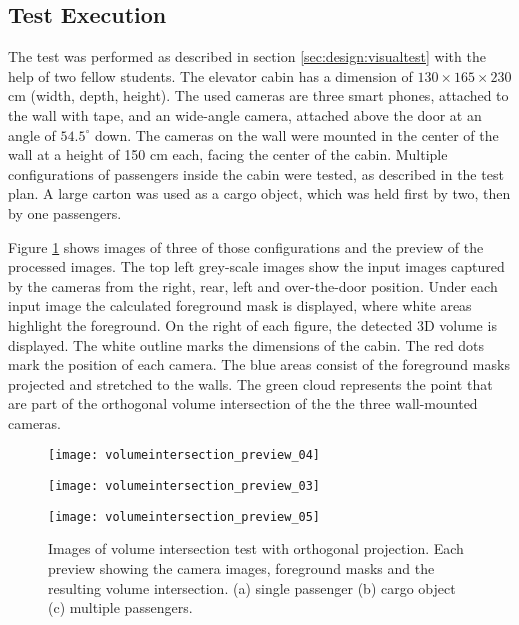 \subsection{Test Execution}
The test was performed as described in section \ref{sec:design:visualtest} with the help of two fellow students.
The elevator cabin has a dimension of $ 130 \times 165 \times 230 $ cm (width, depth, height).
The used cameras are three smart phones, attached to the wall with tape, and an wide-angle camera, attached above the door at an angle of $ 54.5^{\circ} $ down.
The cameras on the wall were mounted in the center of the wall at a height of 150 cm each, facing the center of the cabin.
Multiple configurations of passengers inside the cabin were tested, as described in the test plan.
A large carton was used as a cargo object, which was held first by two, then by one passengers.

Figure \ref{fig:impl:videopreview} shows images of three of those configurations and the preview of the processed images.
The top left grey-scale images show the input images captured by the cameras from the right, rear, left and over-the-door position.
Under each input image the calculated foreground mask is displayed, where white areas highlight the foreground.
On the right of each figure, the detected \ac{3D} volume is displayed.
The white outline marks the dimensions of the cabin.
The red dots mark the position of each camera.
The blue areas consist of the foreground masks projected and stretched to the walls.
The green cloud represents the point that are part of the orthogonal volume intersection of the 
the three wall-mounted cameras.

\begin{figure}[p]
    \centering
    \texttt{[image: volumeintersection\_preview\_04]}
    
    \vspace{0.5em}
    
    \texttt{[image: volumeintersection\_preview\_03]}
    
    \vspace{0.5em}
    
    \texttt{[image: volumeintersection\_preview\_05]}
    
    \caption[Images of volume intersection test with orthogonal projection]{Images of volume intersection test with orthogonal projection. Each preview showing the camera images, foreground masks and the resulting volume intersection. (a) single passenger (b) cargo object (c) multiple passengers.}
    \label{fig:impl:videopreview}
\end{figure}

